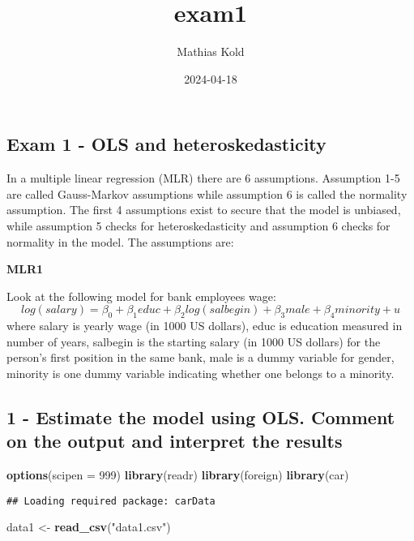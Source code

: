 \documentclass[
]{article}
\title{exam1}
\author{Mathias Kold}
\date{2024-04-18}
\newenvironment{Shaded}{\begin{snugshade}}{\end{snugshade}}
\newcommand{\AttributeTok}[1]{\textcolor[rgb]{0.13,0.29,0.53}{#1}}
\newcommand{\DecValTok}[1]{\textcolor[rgb]{0.00,0.00,0.81}{#1}}
\newcommand{\FunctionTok}[1]{\textcolor[rgb]{0.13,0.29,0.53}{\textbf{#1}}}
\newcommand{\NormalTok}[1]{#1}
\newcommand{\OtherTok}[1]{\textcolor[rgb]{0.56,0.35,0.01}{#1}}
\newcommand{\StringTok}[1]{\textcolor[rgb]{0.31,0.60,0.02}{#1}}
\begin{document}
\maketitle

\subsection{Exam 1 - OLS and
heteroskedasticity}\label{exam-1---ols-and-heteroskedasticity}

In a multiple linear regression (MLR) there are 6 assumptions.
Assumption 1-5 are called Gauss-Markov assumptions while assumption 6 is
called the normality assumption. The first 4 assumptions exist to secure
that the model is unbiased, while assumption 5 checks for
heteroskedasticity and assumption 6 checks for normality in the model.
The assumptions are:

\textbf{MLR1}

Look at the following model for bank employees wage:
\[log(salary)=\beta_0+\beta_1educ+\beta_2log(salbegin)+\beta_3male+\beta_4 minority+u\]
where salary is yearly wage (in 1000 US dollars), educ is education
measured in number of years, salbegin is the starting salary (in 1000 US
dollars) for the person's first position in the same bank, male is a
dummy variable for gender, minority is one dummy variable indicating
whether one belongs to a minority.

\subsection{1 - Estimate the model using OLS. Comment on the output and
interpret the
results}\label{estimate-the-model-using-ols.-comment-on-the-output-and-interpret-the-results}

\begin{Shaded}
\begin{Highlighting}[]
\FunctionTok{options}\NormalTok{(}\AttributeTok{scipen =} \DecValTok{999}\NormalTok{)}
\FunctionTok{library}\NormalTok{(readr)}
\FunctionTok{library}\NormalTok{(foreign)}
\FunctionTok{library}\NormalTok{(car)}
\end{Highlighting}
\end{Shaded}

\begin{verbatim}
## Loading required package: carData
\end{verbatim}

\begin{Shaded}
\begin{Highlighting}[]
\NormalTok{data1 }\OtherTok{\textless{}{-}} \FunctionTok{read\_csv}\NormalTok{(}\StringTok{"data1.csv"}\NormalTok{)}
\end{Highlighting}
\end{Shaded}
\end{document}
